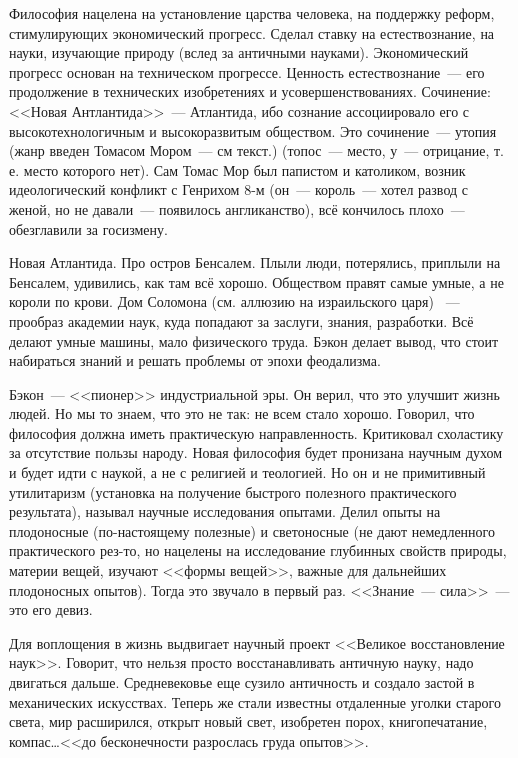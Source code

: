 Философия нацелена на установление царства человека, на поддержку реформ, стимулирующих экономический прогресс. Сделал ставку на естествознание, на науки, изучающие природу (вслед за античными науками). Экономический прогресс основан на техническом прогрессе. Ценность естествознание~--- его продолжение в технических изобретениях и усовершенствованиях. Сочинение: <<Новая Антлантида>>~--- Атлантида, ибо сознание ассоциировало его с высокотехнологичным и высокоразвитым обществом. Это сочинение~--- утопия (жанр введен Томасом Мором~--- см текст.) (топос~--- место, у~--- отрицание, т.\,е. место которого нет). Сам Томас Мор был папистом и католиком, возник идеологический конфликт с Генрихом 8-м (он~--- король~--- хотел развод с женой, но не давали~--- появилось англиканство), всё кончилось плохо~--- обезглавили за госизмену.

Новая Атлантида. Про остров Бенсалем. Плыли люди, потерялись, приплыли на Бенсалем, удивились, как там всё хорошо. Обществом правят самые умные, а не короли по крови. Дом Соломона (см. аллюзию на израильского царя) ~--- прообраз академии наук, куда попадают за заслуги, знания, разработки. Всё делают умные машины, мало физического труда. Бэкон делает вывод, что стоит набираться знаний и решать проблемы от эпохи феодализма. 

Бэкон~--- <<пионер>> индустриальной эры. Он верил, что это улучшит жизнь людей. Но мы то знаем, что это не так: не всем стало хорошо.
Говорил, что философия должна иметь практическую направленность. Критиковал схоластику за отсутствие пользы народу. Новая философия будет пронизана научным духом и будет идти с наукой, а не с религией и теологией. Но он и не примитивный утилитаризм (установка на получение быстрого полезного практического результата), называл научные исследования опытами. Делил опыты на плодоносные (по-настоящему полезные) и светоносные (не дают немедленного практического рез-то, но нацелены на исследование глубинных свойств природы, материи вещей, изучают <<формы вещей>>, важные для дальнейших плодоносных опытов). Тогда это звучало в первый раз. <<Знание~--- сила>>~--- это его девиз. 

Для воплощения в жизнь выдвигает научный проект <<Великое восстановление наук>>. Говорит, что нельзя просто восстанавливать античную науку, надо двигаться дальше. Средневековье еще сузило античность и создало застой в механических искусствах. Теперь же стали известны отдаленные уголки старого света, мир расширился, открыт новый свет, изобретен порох, книгопечатание, компас\ldots <<до бесконечности разрослась груда опытов>>.

